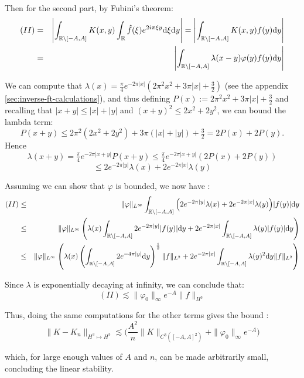 \documentclass[11pt,a4paper]{article}
\begin{document}
~\\
Then for the second part, by Fubini's theorem:
\begin{eqnarray*}
(II) &=&  \left|\int_{\mathbb R \setminus [-A,A]} K(x,y) \int_\mathbb R \hat{f}(\xi) e^{2i\pi\xi y}\mathrm{d}\xi \mathrm{d}y\right|  =\left| \int_{\mathbb R \setminus [-A,A]} K(x,y) f(y)\mathrm{d}y \right|  \\
&=& \left| \int_{\mathbb R \setminus [-A,A]} \lambda(x-y)\varphi(y) f(y)\mathrm{d}y \right| 
\end{eqnarray*}

We can compute that $\lambda(x)=\frac{\pi}{4}e^{-2\pi \lvert x\rvert}\left(2\pi^2x^2+3\pi \lvert x\rvert +\frac{3}{2}\right)$ (see the appendix \ref{sec:inverse-ft-calculations}), and thus defining $P(x):=2\pi^2x^2+3\pi|x|+\tfrac32$ and recalling that  \(|x+y|\le|x|+|y|\) and \((x+y)^2\le2x^2+2y^2\), we can bound the lambda term:
\[
P(x+y)
\le2\pi^2(2x^2+2y^2)+3\pi(|x|+|y|)+\tfrac32
=2P(x)+2P(y).
\]
Hence
\[
\lambda(x+y)
=\tfrac\pi4e^{-2\pi|x+y|}P(x+y)
\le\tfrac\pi4e^{-2\pi|x+y|}(2P(x)+2P(y))
\]
\[
\leq 2e^{-2\pi|y|}\lambda(x)+2e^{-2\pi|x|}\lambda(y)
\]


Assuming we can show that $\varphi$ is bounded, we now have :
\begin{eqnarray*}
(II) &\leq& \|\varphi\|_{L^\infty} \int_{\mathbb R \setminus [-A,A]} \Big( 2e^{-2\pi|y|}\lambda(x)+2e^{-2\pi|x|}\lambda(y)\Big)|f(y)|\mathrm{d}y \\
&\leq&  \|\varphi\|_{L^\infty} \left( \lambda(x) \int_{\mathbb R \setminus [-A,A]} 2e^{-2\pi|y|}|f(y)|\mathrm{d}y +   2e^{-2\pi|x|}\int_{\mathbb R \setminus [-A,A]} \lambda(y)|f(y)|\mathrm{d}y\right)\\
&\leq&  \|\varphi\|_{L^\infty} \left( \lambda(x) \left(\int_{\mathbb R \setminus [-A,A]} 2e^{-4\pi|y|}\mathrm{d}y\right)^\frac{1}{2} \|f\|_{L^2} +   2e^{-2\pi|x|}\int_{\mathbb R \setminus [-A,A]} \lambda(y)^2\mathrm{d}y\|f\|_{L^2}\right)\\
\end{eqnarray*}

Since $\lambda$ is exponentially decaying at infinity, we can conclude that: \[(II) \lesssim \|\varphi_0\|_\infty e^{-A} \|f\|_{H^3}\]

Thus, doing the same computations for the other terms gives the bound : \[\|K-K_n\|_{H^3\mapsto H^3} \lesssim \Big(\frac{A^2}{n}\|K\|_{C^3([-A,A]^2)}+\|\varphi_0\|_\infty e^{-A}\Big)\]

which, for large enough values of $A$ and $n$, can be made arbitrarily small, concluding the linear stability.
\end{document}
